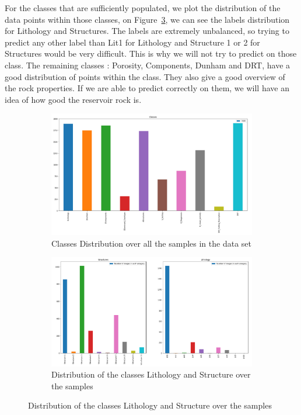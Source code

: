  For the classes that are sufficiently populated, we plot the distribution of the data points within those classes, on Figure~\ref{fig:litandstruct}, we can see the labels distribution for Lithology and Structures. The labels are extremely unbalanced, so trying to predict any other label than Lit1 for Lithology and Structure 1 or 2 for Structures would be very difficult. This is why we will not try to predict on those class. 
 The remaining classes : Porosity, Components, Dunham and DRT, have a good distribution of points within the class. They also give a good overview of the rock properties. If we are able to predict correctly on them, we will have an idea of how good the reservoir rock is. 
\begin{figure}
\begin{subfigure}{.5\textwidth}
  \centering
  \includegraphics[width=.8\linewidth]{figures/03-classes.png}
  \caption{Classes Distribution over all the samples in the data set}
  \label{fig:classes}
\end{subfigure}%
\begin{subfigure}{.5\textwidth}
  \centering
  \includegraphics[width=.8\linewidth]{figures/03-boob.PNG}
  \caption{Distribution of the classes Lithology and Structure over the samples}
  \label{fig:litandstruct}
\end{subfigure}
\end{figure}
